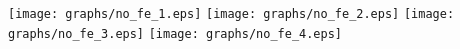\documentclass{article}
\begin{document}
\texttt{[image: graphs/no\_fe\_1.eps]} \pagebreak
\texttt{[image: graphs/no\_fe\_2.eps]} \pagebreak
\texttt{[image: graphs/no\_fe\_3.eps]} \pagebreak
\texttt{[image: graphs/no\_fe\_4.eps]} \pagebreak
\end{document}

